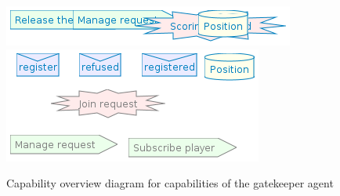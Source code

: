 \documentclass[a4paper]{article}
\begin{document}
\begin{figure}[htp]
  \includegraphics[keepaspectratio,scale=0.45]{pdt/images/detailed_design/release_player_capability_overview_diagram.png}
  \includegraphics[keepaspectratio,scale=0.45]{pdt/images/detailed_design/join_players_capability_overview_diagram.png}
  \label{fig:notary-cap}
  \caption{Capability overview diagram for capabilities of the gatekeeper agent}
\end{figure}
\end{document}
